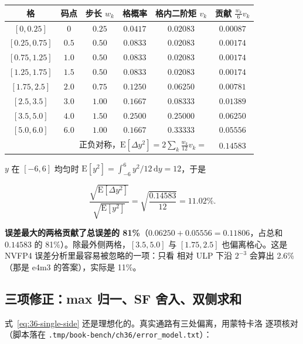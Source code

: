 \begin{center}
\footnotesize
\begin{tabular}{cccccc}
\toprule
格 & 码点 & 步长 $w_k$ & 格概率 & 格内二阶矩 $v_k$ & 贡献 $\frac{w_k}{6}v_k$ \\
\midrule
$[0,0.25]$   & $0$   & $0.25$ & $0.0417$ & $0.02083$ & $0.00087$ \\
$[0.25,0.75]$ & $0.5$ & $0.50$ & $0.0833$ & $0.02083$ & $0.00174$ \\
$[0.75,1.25]$ & $1.0$ & $0.50$ & $0.0833$ & $0.02083$ & $0.00174$ \\
$[1.25,1.75]$ & $1.5$ & $0.50$ & $0.0833$ & $0.02083$ & $0.00174$ \\
$[1.75,2.5]$  & $2.0$ & $0.75$ & $0.1250$ & $0.06250$ & $0.00781$ \\
$[2.5,3.5]$   & $3.0$ & $1.00$ & $0.1667$ & $0.08333$ & $0.01389$ \\
$[3.5,5.0]$   & $4.0$ & $1.50$ & $0.2500$ & $0.25000$ & $0.06250$ \\
$[5.0,6.0]$   & $6.0$ & $1.00$ & $0.1667$ & $0.33333$ & $0.05556$ \\
\midrule
\multicolumn{5}{r}{正负对称，$\mathrm{E}[\Delta y^2]=2\sum_k
  \frac{w_k}{12}v_k=$} & $\mathbf{0.14583}$ \\
\bottomrule
\end{tabular}
\end{center}

$y$ 在 $[-6,6]$ 均匀时 $\mathrm{E}[y^2] = \int_{-6}^{6} y^2/12\,\mathrm{d}y
= 12$，于是

\begin{equation}
  \frac{\sqrt{\mathrm{E}[\Delta y^2]}}{\sqrt{\mathrm{E}[y^2]}}
  = \sqrt{\frac{0.14583}{12}} = 11.02\%.
  \label{eq:36-single-side}
\end{equation}

\textbf{误差最大的两格贡献了总误差的 81\%}（$0.06250+0.05556 =
0.11806$，占总和 $0.14583$ 的 81\%）。除最外侧两格，$[3.5,5.0]$ 与
$[1.75,2.5]$ 也偏离格心。这是 NVFP4 误差分析里最容易被忽略的一项：只看
相对 ULP 下沿 $2^{-3}$ 会算出 2.6\%（那是 e4m3 的答案），实际是 11\%。

\subsection{三项修正：max 归一、SF 舍入、双侧求和}

式~\ref{eq:36-single-side} 还是理想化的。真实通路有三处偏离，用蒙特卡洛
逐项核对（脚本落在 \texttt{.tmp/\allowbreak book-bench/\allowbreak ch36/\allowbreak error\_model.txt}）：

